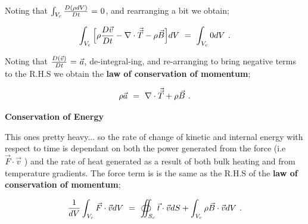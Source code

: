 \documentclass{article}
\begin{document}
Noting that \begin{math} \int_{V_c} \frac{D ( \rho dV )}{D t} \hspace{0.025cm} = \hspace{0.025cm} 0 \end{math}, and rearranging a bit we obtain;

\begin{equation} \label{eq:1}
 \int_{V_c} \Big[ \rho \frac{D  \vec{v}}{D t}  - \nabla \cdot \vec{\vec{T}} - \rho \vec{B} \Big] dV \hspace{0.125cm} = \hspace{0.125cm}  \int_{V_c} 0 dV \hspace{0.125cm}  . 
\end{equation} 

Noting that \begin{math} \frac{D ( \vec{v} )}{D t} \hspace{0.025cm} = \hspace{0.025cm} \vec{a} \end{math}, de-integral-ing, and re-arranging to bring negative terms to the R.H.S we obtain the \textbf{law of conservation of momentum};

\begin{equation} \label{eq:1}
\rho \vec{a} \hspace{0.125cm} = \hspace{0.125cm} \nabla \cdot \vec{\vec{T}} + \rho \vec{B} \hspace{0.125cm}  . 
\end{equation} 


\vspace{0.5cm}

\textbf{Conservation of Energy}

This ones pretty heavy... so the rate of change of kinetic and internal energy with respect to time is dependant on both the power generated from the force (i.e \begin{math} \vec{F} \cdot \vec{v} \end{math} ) and the rate of heat generated as a result of both bulk heating and from temperature gradients. The force term is is the same as the R.H.S of the \textbf{law of conservation of momentum};

\begin{equation} \label{eq:1}
\frac{1}{dV} \int_{V_c} \vec{F} \cdot \vec{v} dV \hspace{0.125cm} = \hspace{0.125cm} \oiint_{S_c} \vec{t} \cdot \vec{v} dS + \int_{V_c} \rho \vec{B} \cdot \vec{v} dV \hspace{0.125cm}  . 
\end{equation} 
\end{document}
